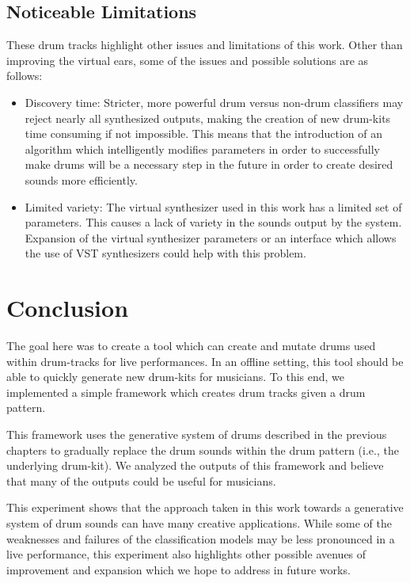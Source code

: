 \documentclass[\main/thesis.tex]{subfiles}
\begin{document}
\subsection{Noticeable Limitations}
 These drum tracks highlight other issues and limitations of this work. Other than improving the virtual ears, some of the issues and possible solutions are as follows:
~\begin{itemize}
    \item  Discovery time: Stricter,  more  powerful  drum  versus  non-drum  classifiers may reject nearly all synthesized outputs, making the creation of new drum-kits time consuming if not impossible. This means that the introduction of an algorithm which intelligently  modifies  parameters in order to successfully make drums will be a necessary step in the future in order to create desired sounds more efficiently.
    
    \item Limited variety: The virtual synthesizer used in this work has a limited set of parameters. This causes a lack of variety in the sounds output by the system. Expansion of the virtual synthesizer parameters or an interface which allows the use of VST synthesizers could help with this problem.
    
\end{itemize}
\section{Conclusion}
The goal here was to create a tool which can create and mutate drums used within drum-tracks for live performances. In an offline setting, this tool should be able to quickly generate new drum-kits for musicians. To this end, we implemented a simple framework which creates drum tracks given a drum pattern. 

This framework uses the generative system of drums described in the previous chapters to gradually replace the drum sounds within the drum pattern (i.e., the underlying drum-kit). We analyzed the outputs of this framework and believe that many of the outputs could be useful for musicians. 

 This experiment shows that the approach taken in this work towards a generative system of drum sounds can have many creative applications. While some of the weaknesses and failures of the classification models may be less pronounced in a live performance, this experiment also highlights other possible avenues of improvement and expansion which we hope to address in future works.
\end{document}
